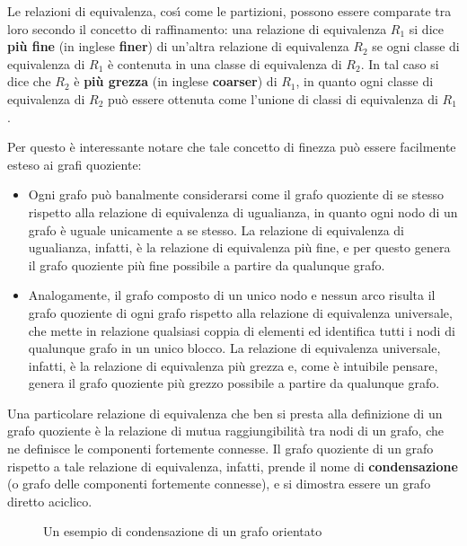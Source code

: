 Le relazioni di equivalenza, cos\'{\i} come le partizioni, possono essere comparate tra
loro secondo il concetto di raffinamento: una relazione di equivalenza $R_1$ si dice \textbf{pi\`u fine}
(in inglese \textbf{finer}) di un'altra relazione di equivalenza $R_2$ se ogni classe di equivalenza di $R_1$ \`e
contenuta in una classe di equivalenza di $R_2$.
In tal caso si dice che $R_2$ \`e \textbf{pi\`u grezza} (in inglese \textbf{coarser}) di $R_1$, in quanto ogni classe
di equivalenza di $R_2$ pu\`o essere ottenuta come l'unione di classi di equivalenza di $R_1$. \newline

Per questo \`e interessante notare che tale concetto di finezza pu\`o essere facilmente esteso ai grafi quoziente:
\begin{itemize}
    \item Ogni grafo pu\`o banalmente considerarsi come il grafo quoziente di se stesso rispetto
    alla relazione di equivalenza di ugualianza, in quanto ogni nodo di un grafo \`e uguale unicamente a se stesso.
    La relazione di equivalenza di ugualianza, infatti, \`e la relazione di equivalenza pi\`u fine, e per questo
    genera il grafo quoziente pi\`u fine possibile a partire da qualunque grafo.
    \item Analogamente, il grafo composto di un unico nodo e nessun arco risulta il grafo quoziente di ogni grafo
    rispetto alla relazione di equivalenza universale, che mette in relazione qualsiasi coppia di elementi ed
    identifica tutti i nodi di qualunque grafo in un unico blocco.
    La relazione di equivalenza universale, infatti, \`e la relazione di equivalenza pi\`u grezza e, come \`e
    intuibile pensare, genera il grafo quoziente pi\`u grezzo possibile a partire da qualunque grafo.
\end{itemize}

Una particolare relazione di equivalenza che ben si presta alla definizione di un grafo quoziente \`e la relazione di
mutua raggiungibilit\`a tra nodi di un grafo, che ne definisce le componenti fortemente connesse.
Il grafo quoziente di un grafo rispetto a tale relazione di equivalenza, infatti, prende il nome di
\textbf{condensazione} (o grafo delle componenti fortemente connesse), e si dimostra essere un grafo diretto aciclico.

\begin{figure}[h]
    \centering
    
    \caption{Un esempio di condensazione di un grafo orientato}
    \label{fig:condensation-example}
\end{figure}


